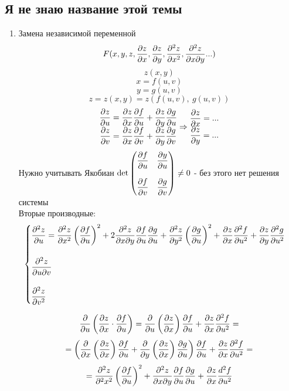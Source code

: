 \documentclass[main]{subfiles}
\begin{document}
    \subsection{Я не знаю название этой темы}

    \begin{enumerate}
        \item Замена независимой переменной
        \[F(x, y, z, \dfrac{\partial z}{\partial x}, \dfrac{\partial z}{\partial y}, \dfrac{\partial^2 z}{\partial x^2}, \dfrac{\partial^2 z}{\partial x \partial y}...)\]
        \[z(x,y)\]
        \[x = f(u,v)\]
        \[y = g(u,v)\]
        \[z = z(x,y) = z(f(u,v),\ g(u,v))\]
        \[\begin{matrix}
            \dfrac{\partial z}{\partial u} = \dfrac{\partial z}{\partial x} \dfrac{\partial f}{\partial u} + \dfrac{\partial z}{\partial y} \dfrac{\partial g}{\partial u}\\
            \dfrac{\partial z}{\partial v} = \dfrac{\partial z}{\partial x} \dfrac{\partial f}{\partial v} + \dfrac{\partial z}{\partial y} \dfrac{\partial g}{\partial v}
        \end{matrix} \Rightarrow \begin{matrix}
            \dfrac{\partial z}{\partial x} = ...\\
            \dfrac{\partial z}{\partial y} = ...
        \end{matrix}\]
        Нужно учитывать Якобиан $\det \begin{pmatrix}
            \dfrac{\partial f}{\partial u} & \dfrac{\partial y}{\partial u}\\ \\
            \dfrac{\partial f}{\partial v} & \dfrac{\partial g}{\partial v}
        \end{pmatrix} \neq 0$ - без этого нет решения системы\\
        Вторые производные:
        \[\begin{cases}
            \dfrac{\partial^2 z}{\partial u} = \dfrac{\partial^2 z}{\partial x^2} \left(\dfrac{\partial f}{\partial u}\right)^2 + 2 \dfrac{\partial^2 z}{\partial x \partial y} \dfrac{\partial f}{\partial u} \dfrac{\partial g}{\partial u} + \dfrac{\partial^2 z}{\partial y^2} \left(\dfrac{\partial g}{\partial u}\right)^2 + \dfrac{\partial z}{\partial x} \dfrac{\partial^2 f}{\partial u^2} + \dfrac{\partial z}{\partial y} \dfrac{\partial^2 g}{\partial u^2}\\ \\
            \dfrac{\partial^2 z}{\partial u \partial v}\\ \\
            \dfrac{\partial^2 z}{\partial v^2}
        \end{cases}\]

        \begin{Example}
            \[\dfrac{\partial}{\partial u} \left(\dfrac{\partial z}{\partial x} \cdot \dfrac{\partial f}{\partial u}\right) = \dfrac{\partial}{\partial u} \left(\dfrac{\partial z}{\partial x}\right) \dfrac{\partial f}{\partial u} + \dfrac{\partial z}{\partial x} \dfrac{\partial^2 f}{\partial u^2} = \]
            \[= \left(\dfrac{\partial}{\partial x} \left(\dfrac{\partial z}{\partial x}\right) \dfrac{\partial f}{\partial u} + \dfrac{\partial}{\partial y}\left(\dfrac{\partial z}{\partial x}\right) \dfrac{\partial g}{\partial u}\right) \dfrac{\partial f}{\partial u} + \dfrac{\partial z}{\partial x} \dfrac{\partial^2 f}{\partial u^2} =\]
            \[= \dfrac{\partial^2 z}{\partial^2 x^2} \left(\dfrac{\partial f}{\partial u}\right)^2 + \dfrac{\partial^2 z}{\partial x \partial y} \dfrac{\partial f}{\partial u} \dfrac{\partial g}{\partial u} + \dfrac{\partial z}{\partial x} \dfrac{d^2 f}{\partial u^2}\]
        \end{Example}


\end{enumerate}
\end{document}
